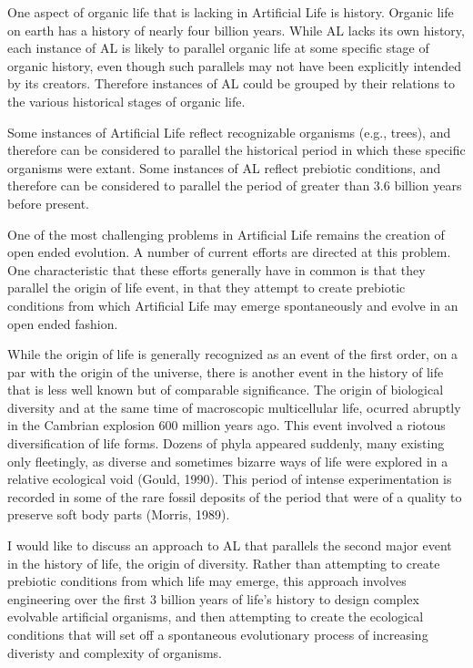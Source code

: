One aspect of organic life that is lacking in Artificial Life is
history.  Organic life on earth has a history of nearly four billion years.
While AL lacks its own history, each instance of AL is likely to parallel
organic life at some specific stage of organic history, even though such
parallels may not have been explicitly intended by its creators.  Therefore
instances of AL could be grouped by their relations to the various historical
stages of organic life.

Some instances of Artificial Life reflect recognizable organisms (e.g.,
trees), and therefore can be considered to parallel the historical period
in which these specific organisms were extant.  Some instances of AL
reflect prebiotic conditions, and therefore can be considered to parallel
the period of greater than 3.6 billion years before present.

One of the most challenging problems in Artificial Life remains the creation
of open ended evolution.  A number of current efforts are directed at this
problem.  One characteristic that these efforts generally have in common
is that they parallel the origin of life event, in that they attempt to
create prebiotic conditions from which Artificial Life may emerge
spontaneously and evolve in an open ended fashion.

While the origin of life is generally recognized as an event of the first
order, on a par with the origin of the universe, there is another event in
the history of life that is less well known but of comparable significance.
The origin of biological diversity and at the same time of macroscopic
multicellular life, ocurred abruptly in the Cambrian explosion 600 million
years ago.  This event involved a riotous diversification of life forms.
Dozens of phyla appeared suddenly, many existing only fleetingly, as diverse
and sometimes bizarre ways of life were explored in a relative ecological
void (Gould, 1990).  This period of intense experimentation is recorded in
some of the rare fossil deposits of the period that were of a quality to
preserve soft body parts (Morris, 1989).

I would like to discuss an approach to AL that parallels the second
major event in the history of life, the origin of diversity.  Rather than
attempting to create prebiotic conditions from which life may emerge, this
approach involves engineering over the first 3 billion years of life's
history to design complex evolvable artificial organisms, and then
attempting to create the ecological conditions that will set off a
spontaneous evolutionary process of increasing diveristy and complexity
of organisms.

